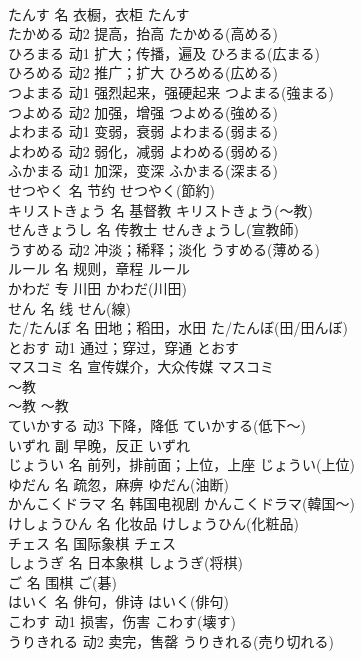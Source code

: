 \documentclass[8pt]{extreport}
\begin{document}
\begin{CJK}{UTF8}{min}
\\	たんす	名	衣橱，衣柜	たんす	
\\	たかめる	动2	提高，抬高	たかめる(高める)	
\\	ひろまる	动1	扩大；传播，遍及	ひろまる(広まる)	
\\	ひろめる	动2	推广；扩大	ひろめる(広める)	
\\	つよまる	动1	强烈起来，强硬起来	つよまる(強まる)	
\\	つよめる	动2	加强，增强	つよめる(強める)	
\\	よわまる	动1	变弱，衰弱	よわまる(弱まる)	
\\	よわめる	动2	弱化，减弱	よわめる(弱める)	
\\	ふかまる	动1	加深，变深	ふかまる(深まる)	
\\	せつやく	名	节约	せつやく(節約)	
\\	キリストきょう	名	基督教	キリストきょう(～教)	
\\	せんきょうし	名	传教士	せんきょうし(宣教師)	
\\	うすめる	动2	冲淡；稀释；淡化	うすめる(薄める)	
\\	ルール	名	规则，章程	ルール	
\\	かわだ	专	川田	かわだ(川田)	
\\	せん	名	线	せん(線)	
\\	た/たんぼ	名	田地；稻田，水田	た/たんぼ(田/田んぼ)	
\\	とおす	动1	通过；穿过，穿通	とおす	
\\	マスコミ	名	宣传媒介，大众传媒	マスコミ	
\\	～教	
\\	～教	～教	
\\	ていかする	动3	下降，降低	ていかする(低下～)	
\\	いずれ	副	早晚，反正	いずれ	
\\	じょうい	名	前列，排前面；上位，上座	じょうい(上位)	
\\	ゆだん	名	疏忽，麻痹	ゆだん(油断)	
\\	かんこくドラマ	名	韩国电视剧	かんこくドラマ(韓国～)	
\\	けしょうひん	名	化妆品	けしょうひん(化粧品)	
\\	チェス	名	国际象棋	チェス	
\\	しょうぎ	名	日本象棋	しょうぎ(将棋)	
\\	ご	名	围棋	ご(碁)	
\\	はいく	名	俳句，俳诗	はいく(俳句)	
\\	こわす	动1	损害，伤害	こわす(壊す)	
\\	うりきれる	动2	卖完，售罄	うりきれる(売り切れる)	

\end{CJK}
\end{document}

